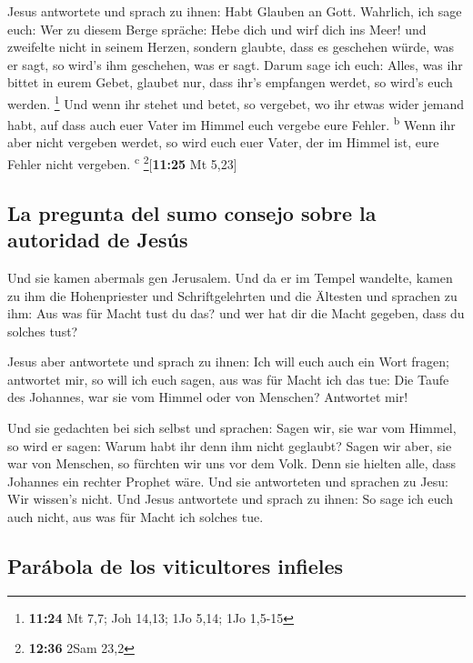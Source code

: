  Jesus antwortete und sprach zu ihnen: Habt Glauben an
Gott.  Wahrlich, ich sage euch: Wer zu diesem Berge
spräche: Hebe dich und wirf dich ins Meer! und zweifelte nicht in seinem
Herzen, sondern glaubte, dass es geschehen würde, was er sagt, so wird's
ihm geschehen, was er sagt.  Darum sage ich euch: Alles,
was ihr bittet in eurem Gebet, glaubet nur, dass ihr's empfangen werdet,
so wird's euch werden. \footnote{\textbf{11:24} Mt 7,7; Joh 14,13; 1Jo
  5,14; 1Jo 1,5-15}  Und wenn ihr stehet und betet, so
vergebet, wo ihr etwas wider jemand habt, auf dass auch euer Vater im
Himmel euch vergebe eure Fehler. \textsuperscript{b} 
Wenn ihr aber nicht vergeben werdet, so wird euch euer Vater, der im
Himmel ist, eure Fehler nicht vergeben. \textsuperscript{c}
\footnote{\textbf{12:36} 2Sam 23,2}{[}\textbf{11:25} Mt 5,23{]}

\hypertarget{la-pregunta-del-sumo-consejo-sobre-la-autoridad-de-jesuxfas}{%
\subsection{La pregunta del sumo consejo sobre la autoridad de
Jesús}\label{la-pregunta-del-sumo-consejo-sobre-la-autoridad-de-jesuxfas}}

 Und sie kamen abermals gen Jerusalem. Und da er im
Tempel wandelte, kamen zu ihm die Hohenpriester und Schriftgelehrten und
die Ältesten  und sprachen zu ihm: Aus was für Macht tust
du das? und wer hat dir die Macht gegeben, dass du solches tust?

 Jesus aber antwortete und sprach zu ihnen: Ich will euch
auch ein Wort fragen; antwortet mir, so will ich euch sagen, aus was für
Macht ich das tue:  Die Taufe des Johannes, war sie vom
Himmel oder von Menschen? Antwortet mir!

 Und sie gedachten bei sich selbst und sprachen: Sagen
wir, sie war vom Himmel, so wird er sagen: Warum habt ihr denn ihm nicht
geglaubt?  Sagen wir aber, sie war von Menschen, so
fürchten wir uns vor dem Volk. Denn sie hielten alle, dass Johannes ein
rechter Prophet wäre.  Und sie antworteten und sprachen
zu Jesu: Wir wissen's nicht. Und Jesus antwortete und sprach zu ihnen:
So sage ich euch auch nicht, aus was für Macht ich solches tue.

\hypertarget{paruxe1bola-de-los-viticultores-infieles}{%
\subsection{Parábola de los viticultores
infieles}\label{paruxe1bola-de-los-viticultores-infieles}}

